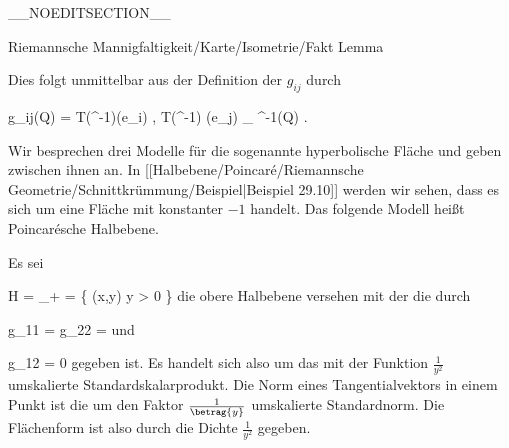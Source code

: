 __NOEDITSECTION__

{Riemannsche Mannigfaltigkeit/Karte/Isometrie/Fakt}
{Lemma}
{}
{

\faktzusatz {}
\faktzusatz {}

}
{

Dies folgt unmittelbar aus der Definition der  $g_{ij}$ durch

\mavergleichskettedisp
{\vergleichskette
{ g_{ij}(Q)
}
{ =} { \left\langle  T(\alpha^{-1})(e_i)  ,  T(\alpha^{-1}) (e_j)    \right\rangle_{ \alpha^{-1}(Q) }
}
{ } {
}
{ } {
}
{ } {
}
}
{}{}{.}

}


Wir besprechen drei Modelle für die sogenannte hyperbolische Fläche
 {} {}
und geben
zwischen ihnen an. In
[[Halbebene/Poincaré/Riemannsche Geometrie/Schnittkrümmung/Beispiel|Beispiel 29.10]]
werden wir sehen, dass es sich um eine Fläche mit konstanter
$-1$ handelt. Das folgende Modell heißt Poincarésche Halbebene.

{

Es sei

\mavergleichskettedisp
{\vergleichskette
{ {\mathbb H}
}
{ =} { \R \times \R_+
}
{ =} { \left\{ (x,y)  \mid   y > 0        \right\}
}
{ } {
}
{ } {
}
}
{}{}{}
die obere Halbebene versehen mit der
die durch

\mavergleichskettedisp
{\vergleichskette
{ g_{11}
}
{ =} { g_{22}
}
{ =} { {  }
}
{ } {
}
{ } {
}
}
{}{}{}
und

\mavergleichskette
{\vergleichskette
{ g_{12}
}
{ = }{ 0
}
{  }{
}
{    }{
}
{   }{
}
}
{}{}{}
gegeben ist. Es handelt sich also um das mit der Funktion ${ \frac{   1  }{  y^2 } }$ umskalierte Standardskalarprodukt. Die Norm eines Tangentialvektors in einem Punkt
 ist die um den Faktor ${ \frac{   1  }{  \betrag {  y  } } }$ umskalierte Standardnorm. Die Flächenform ist also durch die Dichte ${ \frac{   1  }{  y^2 } }$ gegeben.

}

